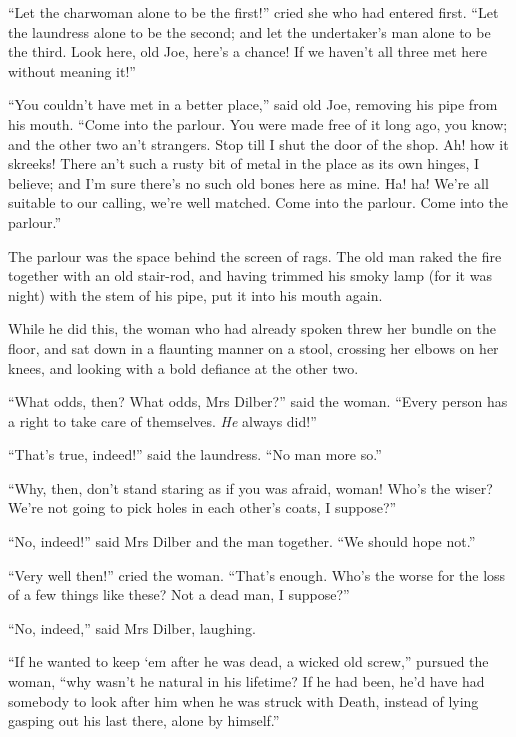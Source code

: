 \documentclass[paper=5.5in:8.5in,BCOR=10mm,twoside,DIV=15,12pt,usegeometry,openany]{scrbook} %
\begin{document}
\enquote{Let the charwoman alone to be the first!} cried she who had entered first. \enquote{Let the laundress alone to be the second; and let the undertaker's man alone to be the third. Look here, old Joe, here's a chance! If we haven't all three met here without meaning it!}

\enquote{You couldn't have met in a better place,} said old Joe, removing his pipe from his mouth. \enquote{Come into the parlour. You were made free of it long ago, you know; and the other two an't strangers. Stop till I shut the door of the shop. Ah! how it skreeks! There an't such a rusty bit of metal in the place as its own hinges, I believe; and I'm sure there's no such old bones here as mine. Ha! ha! We're all suitable to our calling, we're well matched. Come into the parlour. Come into the parlour.}

The parlour was the space behind the screen of rags. The old man raked the fire together with an old stair-rod, and having trimmed his smoky lamp (for it was night) with the stem of his pipe, put it into his mouth again.

While he did this, the woman who had already spoken threw her bundle on the floor, and sat down in a flaunting manner on a stool, crossing her elbows on her knees, and looking with a bold defiance at the other two.

\enquote{What odds, then? What odds, Mrs Dilber?} said the woman. \enquote{Every person has a right to take care of themselves. \textit{He} always did!}

\enquote{That's true, indeed!} said the laundress. \enquote{No man more so.}

\enquote{Why, then, don't stand staring as if you was afraid, woman! Who's the wiser? We're not going to pick holes in each other's coats, I suppose?}

\enquote{No, indeed!} said Mrs Dilber and the man together. \enquote{We should hope not.}

\enquote{Very well then!} cried the woman. \enquote{That's enough. Who's the worse for the loss of a few things like these? Not a dead man, I suppose?}

\enquote{No, indeed,} said Mrs Dilber, laughing.

\enquote{If he wanted to keep `em after he was dead, a wicked old screw,} pursued the woman, \enquote{why wasn't he natural in his lifetime? If he had been, he'd have had somebody to look after him when he was struck with Death, instead of lying gasping out his last there, alone by himself.}
\end{document}
